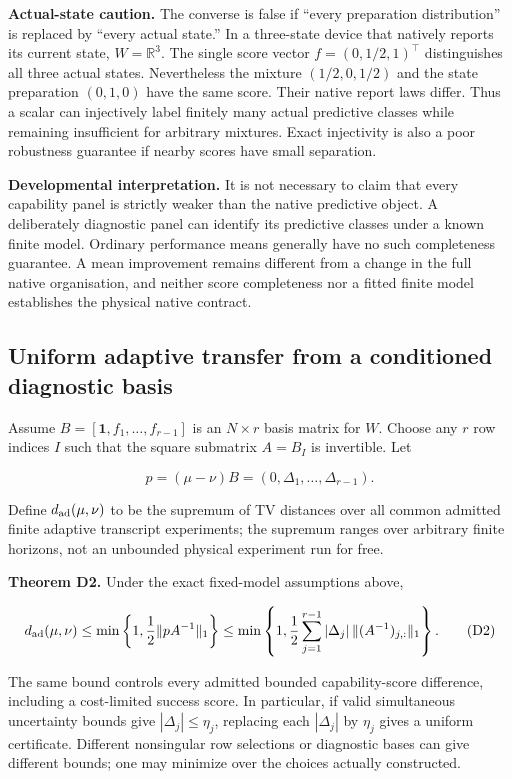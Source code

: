 \documentclass[
  11pt,
  a4paper,
]{article}
\begin{document}
\textbf{Actual-state caution.} The converse is false if ``every
preparation distribution'' is replaced by ``every actual state.'' In a
three-state device that natively reports its current state,
\(W=\mathbb R^3\). The single score vector \(f=(0,1/2,1)^\top\)
distinguishes all three actual states. Nevertheless the mixture
\((1/2,0,1/2)\) and the state preparation \((0,1,0)\) have the same
score. Their native report laws differ. Thus a scalar can injectively
label finitely many actual predictive classes while remaining
insufficient for arbitrary mixtures. Exact injectivity is also a poor
robustness guarantee if nearby scores have small separation.

\textbf{Developmental interpretation.} It is not necessary to claim that
every capability panel is strictly weaker than the native predictive
object. A deliberately diagnostic panel can identify its predictive
classes under a known finite model. Ordinary performance means generally
have no such completeness guarantee. A mean improvement remains
different from a change in the full native organisation, and neither
score completeness nor a fitted finite model establishes the physical
native contract.

\subsection{Uniform adaptive transfer from a conditioned diagnostic
basis}\label{uniform-adaptive-transfer-from-a-conditioned-diagnostic-basis}

Assume \(B=[\mathbf1,f_1,\ldots,f_{r-1}]\) is an \(N\times r\) basis
matrix for \(W\). Choose any \(r\) row indices \(I\) such that the
square submatrix \(A=B_I\) is invertible. Let

\[
p=(\mu-\nu)B=(0,\Delta_1,\ldots,\Delta_{r-1}).
\]

Define \(d_{\rm ad}(\mu,\nu)\) to be the supremum of TV distances over
all common admitted finite adaptive transcript experiments; the supremum
ranges over arbitrary finite horizons, not an unbounded physical
experiment run for free.

\textbf{Theorem D2.} Under the exact fixed-model assumptions above,

\[
d_{\rm ad}(\mu,\nu)
\le \min\left\{1,\frac12\|pA^{-1}\|_1\right\}
\le \min\left\{1,\frac12\sum_{j=1}^{r-1}|\Delta_j|\,\|(A^{-1})_{j,:}\|_1\right\}.
\tag{D2}
\]

The same bound controls every admitted bounded capability-score
difference, including a cost-limited success score. In particular, if
valid simultaneous uncertainty bounds give \(|\Delta_j|\le\eta_j\),
replacing each \(|\Delta_j|\) by \(\eta_j\) gives a uniform certificate.
Different nonsingular row selections or diagnostic bases can give
different bounds; one may minimize over the choices actually
constructed.
\end{document}
